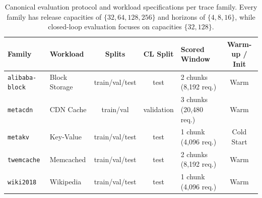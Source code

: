 \begin{table}[tbp]
  \centering
  \small
  \caption{Canonical evaluation protocol and workload specifications per trace family. Every family has release capacities of $\{32, 64, 128, 256\}$ and horizons of $\{4, 8, 16\}$, while closed-loop evaluation focuses on capacities $\{32, 128\}$.}
  \label{tab:evaluation-protocols}
  \begin{tabularx}{\textwidth}{@{}l P{0.13\textwidth} c c L c@{}}
    \toprule
    Family & Workload & Splits & CL Split & Scored Window & Warm-up / Init \\
    \midrule
    \texttt{alibaba-block} & Block Storage & train/val/test & test & 2 chunks (8,192 req.) & Warm \\
    \texttt{metacdn} & CDN Cache & train/val & validation & 3 chunks (20,480 req.) & Warm \\
    \texttt{metakv} & Key-Value & train/val/test & test & 1 chunk (4,096 req.) & Cold Start \\
    \texttt{twemcache} & Memcached & train/val/test & test & 2 chunks (8,192 req.) & Warm \\
    \texttt{wiki2018} & Wikipedia & train/val/test & test & 1 chunk (4,096 req.) & Warm \\
    \bottomrule
  \end{tabularx}
\end{table}
